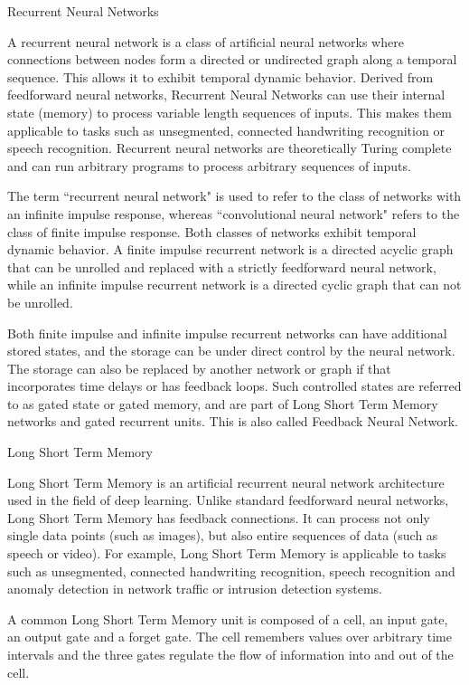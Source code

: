 Recurrent Neural Networks

A recurrent neural network is a class of artificial neural networks where connections between nodes form a directed or undirected graph along a temporal sequence. This allows it to exhibit temporal dynamic behavior. Derived from feedforward neural networks, Recurrent Neural Networks can use their internal state (memory) to process variable length sequences of inputs. This makes them applicable to tasks such as unsegmented, connected handwriting recognition or speech recognition. Recurrent neural networks are theoretically Turing complete and can run arbitrary programs to process arbitrary sequences of inputs.

The term ``recurrent neural network" is used to refer to the class of networks with an infinite impulse response, whereas ``convolutional neural network" refers to the class of finite impulse response. Both classes of networks exhibit temporal dynamic behavior. A finite impulse recurrent network is a directed acyclic graph that can be unrolled and replaced with a strictly feedforward neural network, while an infinite impulse recurrent network is a directed cyclic graph that can not be unrolled.

Both finite impulse and infinite impulse recurrent networks can have additional stored states, and the storage can be under direct control by the neural network. The storage can also be replaced by another network or graph if that incorporates time delays or has feedback loops. Such controlled states are referred to as gated state or gated memory, and are part of Long Short Term Memory networks and gated recurrent units. This is also called Feedback Neural Network.

Long Short Term Memory

Long Short Term Memory is an artificial recurrent neural network architecture used in the field of deep learning. Unlike standard feedforward neural networks, Long Short Term Memory has feedback connections. It can process not only single data points (such as images), but also entire sequences of data (such as speech or video). For example, Long Short Term Memory is applicable to tasks such as unsegmented, connected handwriting recognition, speech recognition and anomaly detection in network traffic or intrusion detection systems.

A common Long Short Term Memory unit is composed of a cell, an input gate, an output gate and a forget gate. The cell remembers values over arbitrary time intervals and the three gates regulate the flow of information into and out of the cell.

